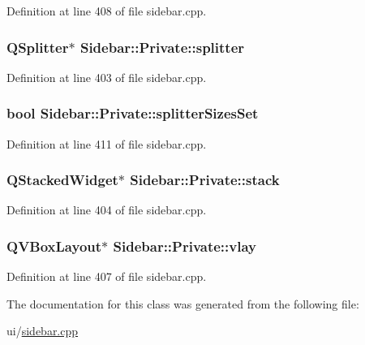 Definition at line 408 of file sidebar.\+cpp.

\hypertarget{classSidebar_1_1Private_acbf19dbc3945da830d814331d5fc9a26}{
\subsubsection[{splitter}]{\setlength{\rightskip}{0pt plus 5cm}Q\+Splitter$\ast$ Sidebar\+::\+Private\+::splitter}}\label{classSidebar_1_1Private_acbf19dbc3945da830d814331d5fc9a26}


Definition at line 403 of file sidebar.\+cpp.

\hypertarget{classSidebar_1_1Private_a99a16d70b6092f5ae63c2b349006beb0}{
\subsubsection[{splitter\+Sizes\+Set}]{\setlength{\rightskip}{0pt plus 5cm}bool Sidebar\+::\+Private\+::splitter\+Sizes\+Set}}\label{classSidebar_1_1Private_a99a16d70b6092f5ae63c2b349006beb0}


Definition at line 411 of file sidebar.\+cpp.

\hypertarget{classSidebar_1_1Private_abe83197f943319864ba227501d81cd04}{
\subsubsection[{stack}]{\setlength{\rightskip}{0pt plus 5cm}Q\+Stacked\+Widget$\ast$ Sidebar\+::\+Private\+::stack}}\label{classSidebar_1_1Private_abe83197f943319864ba227501d81cd04}


Definition at line 404 of file sidebar.\+cpp.

\hypertarget{classSidebar_1_1Private_a5c6712e42bbf4615df9c2366dd7fa073}{
\subsubsection[{vlay}]{\setlength{\rightskip}{0pt plus 5cm}Q\+V\+Box\+Layout$\ast$ Sidebar\+::\+Private\+::vlay}}\label{classSidebar_1_1Private_a5c6712e42bbf4615df9c2366dd7fa073}


Definition at line 407 of file sidebar.\+cpp.



The documentation for this class was generated from the following file\+:\begin{DoxyCompactItemize}
\item 
ui/\hyperlink{sidebar_8cpp}{sidebar.\+cpp}\end{DoxyCompactItemize}
